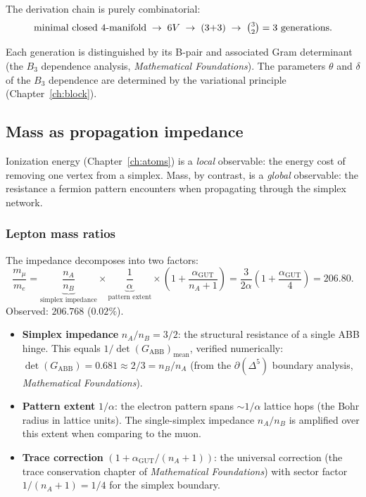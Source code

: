 \documentclass[12pt]{article}
\theoremstyle{remark}
\theoremstyle{definition}
\begin{document}
The derivation chain is purely combinatorial:
\begin{equation}
\text{minimal closed $4$-manifold} \;\to\; 6V \;\to\; (3{+}3) \;\to\; \tbinom{3}{2} = 3 \text{ generations}.
\end{equation}

Each generation is distinguished by its B-pair and associated Gram determinant (the $B_3$ dependence analysis, \textit{Mathematical Foundations}).  The parameters $\theta$ and $\delta$ of the $B_3$ dependence are determined by the variational principle (Chapter~\ref{ch:block}).

\subsection{Mass as propagation impedance}
\label{sec:mass_impedance}

Ionization energy (Chapter~\ref{ch:atoms}) is a \emph{local} observable: the energy cost of removing one vertex from a simplex.  Mass, by contrast, is a \emph{global} observable: the resistance a fermion pattern encounters when propagating through the simplex network.

\subsubsection{Lepton mass ratios}

The impedance decomposes into two factors:
\begin{equation}
\label{eq:mu_e}
\boxed{\frac{m_\mu}{m_e} = \underbrace{\frac{n_A}{n_B}}_{\text{simplex impedance}} \times \underbrace{\frac{1}{\alpha}}_{\text{pattern extent}} \times \left(1 + \frac{\alpha_\mathrm{GUT}}{n_A + 1}\right) = \frac{3}{2\alpha}\left(1 + \frac{\alpha_\mathrm{GUT}}{4}\right) = 206.80.}
\end{equation}
Observed: $206.768$ ($0.02\%$).

\begin{itemize}
\item \textbf{Simplex impedance} $n_A/n_B = 3/2$: the structural resistance of a single ABB hinge.  This equals $1/\det(G_\mathrm{ABB})_\mathrm{mean}$, verified numerically: $\det(G_\mathrm{ABB}) = 0.681 \approx 2/3 = n_B/n_A$ (from the $\partial(\Delta^5)$ boundary analysis, \textit{Mathematical Foundations}).

\item \textbf{Pattern extent} $1/\alpha$: the electron pattern spans $\sim 1/\alpha$ lattice hops (the Bohr radius in lattice units).  The single-simplex impedance $n_A/n_B$ is amplified over this extent when comparing to the muon.

\item \textbf{Trace correction} $(1 + \alpha_\mathrm{GUT}/(n_A+1))$: the universal correction (the trace conservation chapter of \textit{Mathematical Foundations}) with sector factor $1/(n_A+1) = 1/4$ for the simplex boundary.
\end{itemize}
\end{document}
